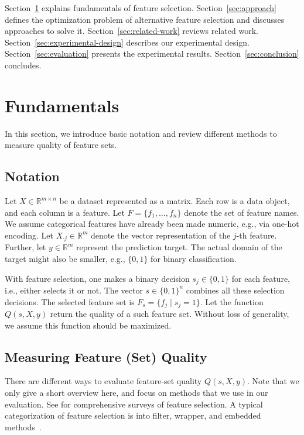 \documentclass{article}
\theoremstyle{definition}
\begin{document}
Section~\ref{sec:fundamentals} explains fundamentals of feature selection.
Section~\ref{sec:approach} defines the optimization problem of alternative feature selection and discusses approaches to solve it.
Section~\ref{sec:related-work} reviews related work.
Section~\ref{sec:experimental-design} describes our experimental design.
Section~\ref{sec:evaluation} presents the experimental results.
Section~\ref{sec:conclusion} concludes.

\section{Fundamentals}
\label{sec:fundamentals}

In this section, we introduce basic notation and review different methods to measure quality of feature sets.

\subsection{Notation}
\label{sec:fundamentals:notation}

Let $X \in \mathbb{R}^{m \times n}$ be a dataset represented as a matrix.
Each row is a data object, and each column is a feature.
Let $F = \{f_1, \dots, f_n\}$ denote the set of feature names.
We assume categorical features have already been made numeric, e.g., via one-hot encoding.
Let $X_{\cdot{}j} \in \mathbb{R}^m$ denote the vector representation of the $j$-th feature.
Further, let $y \in \mathbb{R}^m$ represent the prediction target.
The actual domain of the target might also be smaller, e.g., $\{0,1\}$ for binary classification.

With feature selection, one makes a binary decision $s_j \in \{0,1\}$ for each feature, i.e., either selects it or not.
The vector $s \in \{0,1\}^n$ combines all these selection decisions.
The selected feature set is $F_s = \{f_j \mid s_j=1\}$.
Let the function $Q(s,X,y)$ return the quality of a such feature set.
Without loss of generality, we assume this function should be maximized.

\subsection{Measuring Feature (Set) Quality}
\label{sec:fundamentals:quality}

There are different ways to evaluate feature-set quality $Q(s,X,y)$.
Note that we only give a short overview here, and focus on methods that we use in our evaluation.
See \cite{chandrashekar2014survey,li2017feature} for comprehensive surveys of feature selection.
A typical categorization of feature selection is into filter, wrapper, and embedded methods~\cite{guyon2003introduction}.
\end{document}
